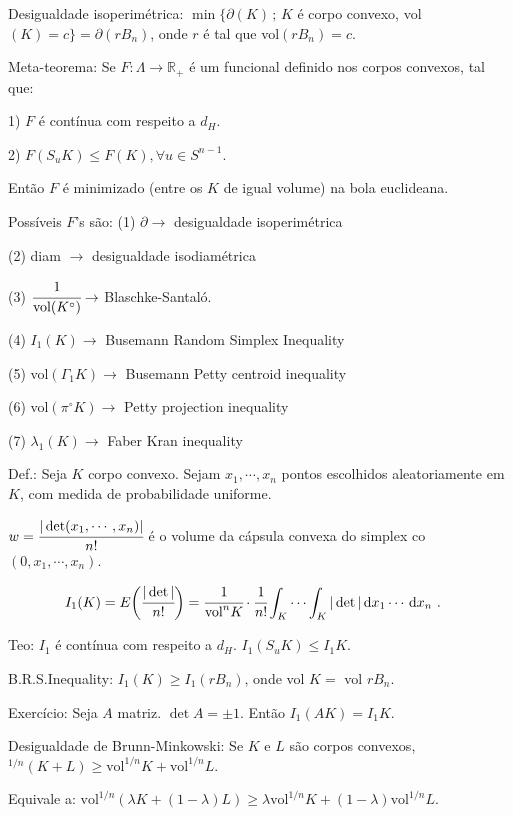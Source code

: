 \documentclass[12pt]{article}
\begin{document}
Desigualdade isoperim\'etrica: $\min \{ \partial(K)\,;\,K$ \'e corpo convexo, vol$(K) = c \} = \partial(rB_n)$, onde $r$ \'e tal que vol$(rB_n) = c$.

Meta-teorema: Se $F: \Lambda \to \mathbb{R}_+$ \'e um funcional definido nos corpos convexos, tal que:

1) $F$ \'e cont\'inua com respeito a $d_H$.

2) $F(S_u K) \le F(K), \forall u \in S^{n - 1}$.

Ent\~ao $F$ \'e minimizado (entre os $K$ de igual volume) na bola euclideana.

Poss\'iveis $F$'s s\~ao: (1) $\partial \to$ desigualdade isoperim\'etrica

(2) diam $\to$ desigualdade isodiam\'etrica

(3) $\cfrac{1}{\text{vol}(K^\circ)}\to$ Blaschke-Santal\'o.

(4) $I_1(K) \to$ Busemann Random Simplex Inequality

(5) vol$(\Gamma_1 K) \to $ Busemann Petty centroid inequality

(6) vol$(\pi^\circ K) \to $ Petty projection inequality

(7) $\lambda_1(K) \to$ Faber Kran inequality

Def.: Seja $K$ corpo convexo. Sejam $x_1, \cdots, x_n$ pontos escolhidos aleatoriamente em $K$, com medida de probabilidade uniforme.

$w = \cfrac{| \det(x_1, \cdots, x_n) |}{n!}$ \'e o volume da c\'apsula convexa do simplex co$(0, x_1, \cdots, x_n)$.

\begin{align}
I_1(K) &= E\bigg( \cfrac{|\det|}{n!} \bigg) = \cfrac{1}{\text{vol}^n K}\cdot \cfrac{1}{n!} \int_K \cdots \int_K |\det| \,\mathrm{d}x_1 \cdots\,\mathrm{d}x_n\,\,.
\end{align}

Teo: $I_1$ \'e cont\'inua com respeito a $d_H$. $I_1(S_u K) \le I_1 K$.

B.R.S.Inequality: $I_1(K) \ge I_1(rB_n)$, onde vol $K = $ vol $rB_n$.

Exerc\'icio: Seja $A$ matriz. $\det A = \pm 1$. Ent\~ao $I_1(AK) = I_1 K$.

\vspace{100mm}

Desigualdade de Brunn-Minkowski: Se $K$ e $L$ s\~ao corpos convexos, $^{1/n}(K + L) \ge \text{vol}^{1/n} K + \text{vol}^{1/n} L$.

Equivale a: $\text{vol}^{1/n}(\lambda K + (1 - \lambda)L) \ge \lambda \text{vol}^{1/n} K + (1 - \lambda) \text{vol}^{1/n} L$.
\end{document}

